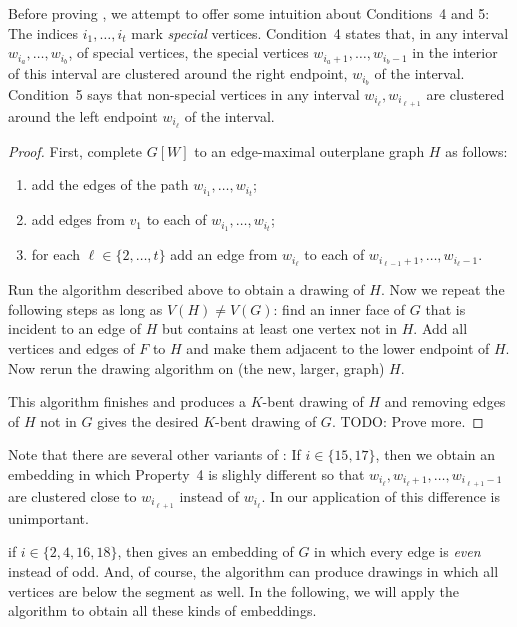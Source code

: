 \documentclass{patmorin}
\begin{document}
Before proving , we attempt to offer some
intuition about 
Conditions~4 and 5: The indices
$i_1,\ldots,i_t$ mark \emph{special} vertices.  Condition~4 states
that, in any interval $w_{i_a},\ldots,w_{i_b}$, of special vertices,
the special vertices $w_{i_a+1},\ldots,w_{i_b-1}$ in the interior
of this interval are clustered around the right endpoint, $w_{i_b}$
of the interval.  Condition~5 says that non-special vertices in any
interval $w_{i_{\ell}},w_{i_{\ell+1}}$ are clustered around the left
endpoint $w_{i_\ell}$ of the interval.

\begin{proof}
  First, complete $G[W]$ to an edge-maximal outerplane graph $H$ as follows:
\begin{enumerate}
  \item add the edges of the path $w_{i_1},\ldots,w_{i_t}$;
  \item add edges from $v_1$ to each of $w_{i_1},\ldots,w_{i_t}$;
  \item for each $\ell\in\{2,\ldots,t\}$ add an edge from $w_{i_\ell}$ to each of $w_{i_{\ell-1}+1},\ldots,w_{i_\ell-1}$. 
\end{enumerate}
  Run the algorithm described above to obtain a drawing of $H$.  Now we
  repeat the following steps as long as $V(H)\neq V(G)$: find an inner
  face of $G$ that is incident to an edge of $H$ but contains at least
  one vertex not in $H$. Add all vertices and edges of $F$ to $H$ and
  make them adjacent to the lower endpoint of $H$. Now rerun the drawing
  algorithm on (the new, larger, graph) $H$.

  This algorithm finishes and produces a $K$-bent drawing of $H$ and
  removing edges of $H$ not in $G$ gives the desired $K$-bent drawing
  of $G$.  TODO: Prove more.
\end{proof}

Note that there are several other variants of
: If $i\in\{15,17\}$, then we obtain
an embedding in which Property~4 is slighly different so that
$w_{i_\ell},w_{i_\ell+1},\ldots,w_{i_{\ell+1}-1}$ are clustered close
to $w_{i_{\ell+1}}$ instead of $w_{i_\ell}$. In our application of
 this difference is unimportant.

if $i\in\{2,4,16,18\}$, then  gives an embedding
of $G$ in which every edge is \emph{even} instead of odd.  And, of course,
the algorithm can produce drawings in which all vertices are below the
segment as well.  In the following, we will apply the algorithm to obtain
all these kinds of embeddings.
\end{document}
